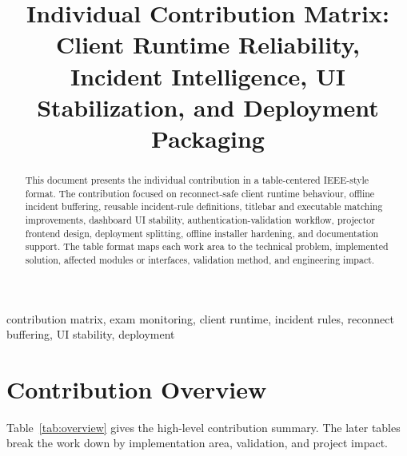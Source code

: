 \documentclass[conference]{IEEEtran}
\begin{document}
\title{Individual Contribution Matrix:\\
Client Runtime Reliability, Incident Intelligence, UI Stabilization, and Deployment Packaging}

\author{
}

\maketitle

\begin{abstract}
This document presents the individual contribution in a table-centered IEEE-style format. The contribution focused on reconnect-safe client runtime behaviour, offline incident buffering, reusable incident-rule definitions, titlebar and executable matching improvements, dashboard UI stability, authentication-validation workflow, projector frontend design, deployment splitting, offline installer hardening, and documentation support. The table format maps each work area to the technical problem, implemented solution, affected modules or interfaces, validation method, and engineering impact.
\end{abstract}

\begin{IEEEkeywords}
contribution matrix, exam monitoring, client runtime, incident rules, reconnect buffering, UI stability, deployment
\end{IEEEkeywords}

\section{Contribution Overview}

Table~\ref{tab:overview} gives the high-level contribution summary. The later tables break the work down by implementation area, validation, and project impact.
\end{document}
